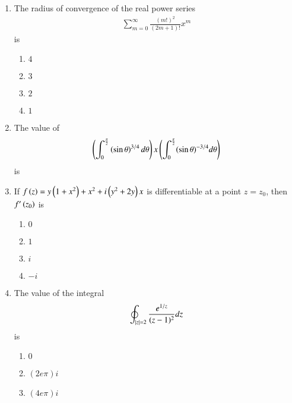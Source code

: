 \documentclass[journal]{IEEEtran}
\begin{document}
\begin{enumerate}
\begin{enumerate}
        	\end{enumerate}	
	\item The radius of convergence of the real power series
             \begin{align*}
		\sum_{m=0}^{\infty} \frac{(m!)^{2}}{(2 m+1)!} x^{m} 
             \end{align*}
		is
		\begin{enumerate}
			\item $4$
            \item $3$
            \item $2$
            \item $1$
        	\end{enumerate}	
	\item  The value of
           \begin{align*}
		\left(\int_{0}^{\frac{\pi}{2}}\left(\sin \theta\right)^{3 / 4} d \theta\right) x\left(\int_{0}^{\frac{\pi}{2}}(\sin \theta)^{-3 / 4} d \theta\right)
             \end{align*}
             is
		\begin{enumerate}
        	\end{enumerate}	
	\item If $f\left(z\right)=y\left(1+x^{2}\right)+x^{2}+i\left(y^{2}+2 y\right) x$ is differentiable at a point $z=z_{0}$, then $f'\left(z_{0}\right)$ is
                \begin{enumerate}
			\item $0$
			\item $1$
			\item $i$
			\item $-i$
        	\end{enumerate}		
	\item The value of the integral
        \begin{align*}
            \oint_{\left\vert z\right\vert=2} \frac{e^{1 / z}}{(z-1)^{2}} d z
        \end{align*}
        is
		\begin{enumerate}
			\item $0$
			\item $(2 e \pi) i$
			\item $(4 e \pi) i$

\end{enumerate}
\end{enumerate}
\end{document}
